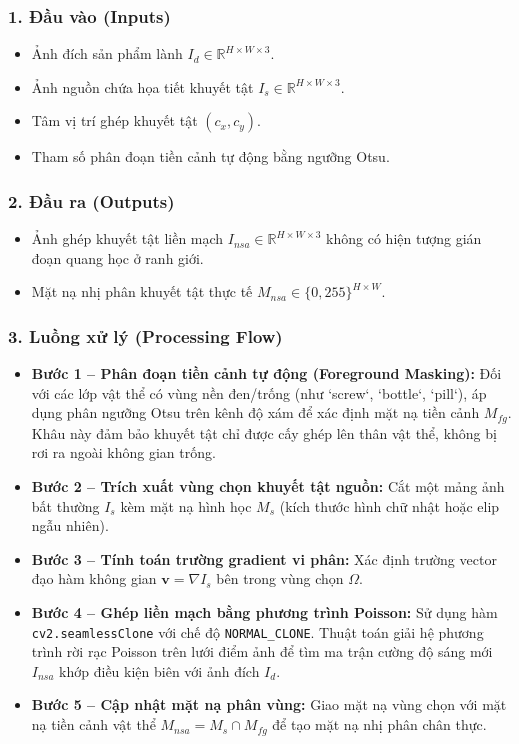 \subsubsection*{1. Đầu vào (Inputs)}
\begin{itemize}
    \item Ảnh đích sản phẩm lành $I_d \in \mathbb{R}^{H \times W \times 3}$.
    \item Ảnh nguồn chứa họa tiết khuyết tật $I_s \in \mathbb{R}^{H \times W \times 3}$.
    \item Tâm vị trí ghép khuyết tật $(c_x, c_y)$.
    \item Tham số phân đoạn tiền cảnh tự động bằng ngưỡng Otsu.
\end{itemize}

\subsubsection*{2. Đầu ra (Outputs)}
\begin{itemize}
    \item Ảnh ghép khuyết tật liền mạch $I_{nsa} \in \mathbb{R}^{H \times W \times 3}$ không có hiện tượng gián đoạn quang học ở ranh giới.
    \item Mặt nạ nhị phân khuyết tật thực tế $M_{nsa} \in \{0, 255\}^{H \times W}$.
\end{itemize}

\subsubsection*{3. Luồng xử lý (Processing Flow)}
\begin{itemize}
    \item \textbf{Bước 1 -- Phân đoạn tiền cảnh tự động (Foreground Masking):} Đối với các lớp vật thể có vùng nền đen/trống (như `screw`, `bottle`, `pill`), áp dụng phân ngưỡng Otsu trên kênh độ xám để xác định mặt nạ tiền cảnh $M_{fg}$. Khâu này đảm bảo khuyết tật chỉ được cấy ghép lên thân vật thể, không bị rơi ra ngoài không gian trống.
    \item \textbf{Bước 2 -- Trích xuất vùng chọn khuyết tật nguồn:} Cắt một mảng ảnh bất thường $I_s$ kèm mặt nạ hình học $M_s$ (kích thước hình chữ nhật hoặc elip ngẫu nhiên).
    \item \textbf{Bước 3 -- Tính toán trường gradient vi phân:} Xác định trường vector đạo hàm không gian $\mathbf{v} = \nabla I_s$ bên trong vùng chọn $\Omega$.
    \item \textbf{Bước 4 -- Ghép liền mạch bằng phương trình Poisson:} Sử dụng hàm \texttt{cv2.seamlessClone} với chế độ \texttt{NORMAL\_CLONE}. Thuật toán giải hệ phương trình rời rạc Poisson trên lưới điểm ảnh để tìm ma trận cường độ sáng mới $I_{nsa}$ khớp điều kiện biên với ảnh đích $I_d$.
    \item \textbf{Bước 5 -- Cập nhật mặt nạ phân vùng:} Giao mặt nạ vùng chọn với mặt nạ tiền cảnh vật thể $M_{nsa} = M_s \cap M_{fg}$ để tạo mặt nạ nhị phân chân thực.
\end{itemize}

